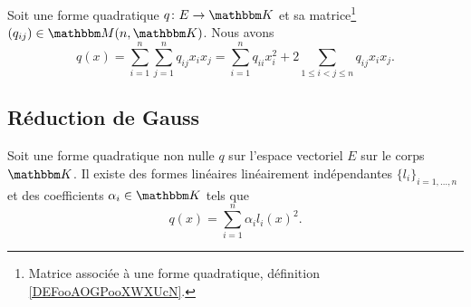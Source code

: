 \begin{proposition}     \label{PROPooCIEUooODqfwm}
    Soit une forme quadratique \( q\colon E\to \eK\) et sa matrice\footnote{Matrice associée à une forme quadratique, définition \ref{DEFooAOGPooXWXUcN}.} \( (q_{ij})\in \eM(n,\eK)\). Nous avons
    \begin{equation}        \label{EQooQROVooBfshbZ}
        q(x)=\sum_{i=1}^n\sum_{j=1}^nq_{ij}x_ix_j=\sum_{i=1}^nq_{ii}x_i^2+2\sum_{1\leq i <j\leq n}q_{ij}x_ix_j.
    \end{equation}
\end{proposition}

\subsection{Réduction de Gauss}

\begin{theorem}     \label{THOooOMMFooKxqICS}
    Soit une forme quadratique non nulle \( q\) sur l'espace vectoriel \( E\) sur le corps \( \eK\). Il existe des formes linéaires linéairement indépendantes \(\{ l_i \}_{i=1,\ldots, n}\) et des coefficients \( \alpha_i\in \eK\) tels que 
        \begin{equation}
            q(x)=\sum_{i=1}^n\alpha_il_i(x)^2.
        \end{equation}
\end{theorem}

